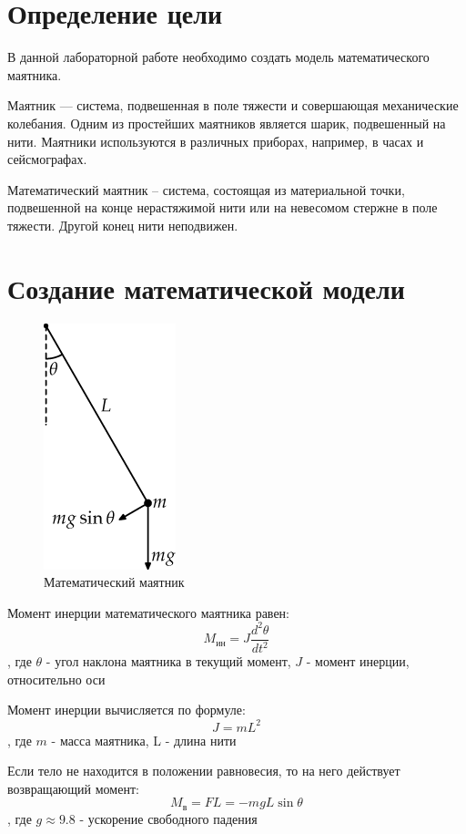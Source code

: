 \documentclass[a4paper, 14pt]{extarticle}
\begin{document}
	\pagebreak	

	\section{Определение цели}
		В данной лабораторной работе необходимо создать модель математического маятника.
		
		Маятник — система, подвешенная в поле тяжести и совершающая механические колебания. Одним из простейших маятников является шарик, подвешенный на нити. Маятники используются в различных приборах, например, в часах и сейсмографах.
		
		Математический маятник -- система, состоящая из материальной точки, подвешенной на конце нерастяжимой
		нити или на невесомом стержне в поле тяжести. Другой конец нити неподвижен.
		
	\section{Создание математической модели}
		\begin{figure}[H]
			\centering
			\includegraphics[]{fig1.png}
			\caption[.] {Математический маятник}
		\end{figure}
		
		Момент инерции математического маятника равен:
		\[ M_{\text{ин}} = J\dfrac{d^2\theta}{dt^2} \tag{1} \label{eq:1} \],
		где $\theta$ - угол наклона маятника в текущий момент, $J$ - момент инерции, относительно оси
		
		Момент инерции вычисляется по формуле:
		\[ J = mL^2 \tag{2} \label{eq:2} \], где $m$ - масса маятника, L - длина нити
		
		Если тело не находится в положении равновесия, то на него действует возвращающий момент:
		\[ M_{\text{в}} = FL = -mgL\sin{\theta} \], где $g \approx 9.8$ - ускорение свободного падения
		
\end{document}

